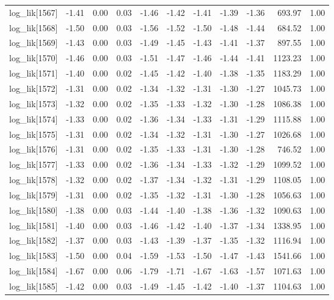 \begin{table}[ht]
\begin{tabular}{rrrrrrrrrrr}
  log\_lik[1567] & -1.41 & 0.00 & 0.03 & -1.46 & -1.42 & -1.41 & -1.39 & -1.36 & 693.97 & 1.00 \\ 
  log\_lik[1568] & -1.50 & 0.00 & 0.03 & -1.56 & -1.52 & -1.50 & -1.48 & -1.44 & 684.52 & 1.00 \\ 
  log\_lik[1569] & -1.43 & 0.00 & 0.03 & -1.49 & -1.45 & -1.43 & -1.41 & -1.37 & 897.55 & 1.00 \\ 
  log\_lik[1570] & -1.46 & 0.00 & 0.03 & -1.51 & -1.47 & -1.46 & -1.44 & -1.41 & 1123.23 & 1.00 \\ 
  log\_lik[1571] & -1.40 & 0.00 & 0.02 & -1.45 & -1.42 & -1.40 & -1.38 & -1.35 & 1183.29 & 1.00 \\ 
  log\_lik[1572] & -1.31 & 0.00 & 0.02 & -1.34 & -1.32 & -1.31 & -1.30 & -1.27 & 1045.73 & 1.00 \\ 
  log\_lik[1573] & -1.32 & 0.00 & 0.02 & -1.35 & -1.33 & -1.32 & -1.30 & -1.28 & 1086.38 & 1.00 \\ 
  log\_lik[1574] & -1.33 & 0.00 & 0.02 & -1.36 & -1.34 & -1.33 & -1.31 & -1.29 & 1115.88 & 1.00 \\ 
  log\_lik[1575] & -1.31 & 0.00 & 0.02 & -1.34 & -1.32 & -1.31 & -1.30 & -1.27 & 1026.68 & 1.00 \\ 
  log\_lik[1576] & -1.31 & 0.00 & 0.02 & -1.35 & -1.33 & -1.31 & -1.30 & -1.28 & 746.52 & 1.00 \\ 
  log\_lik[1577] & -1.33 & 0.00 & 0.02 & -1.36 & -1.34 & -1.33 & -1.32 & -1.29 & 1099.52 & 1.00 \\ 
  log\_lik[1578] & -1.32 & 0.00 & 0.02 & -1.37 & -1.34 & -1.32 & -1.31 & -1.29 & 1108.05 & 1.00 \\ 
  log\_lik[1579] & -1.31 & 0.00 & 0.02 & -1.35 & -1.32 & -1.31 & -1.30 & -1.28 & 1056.63 & 1.00 \\ 
  log\_lik[1580] & -1.38 & 0.00 & 0.03 & -1.44 & -1.40 & -1.38 & -1.36 & -1.32 & 1090.63 & 1.00 \\ 
  log\_lik[1581] & -1.40 & 0.00 & 0.03 & -1.46 & -1.42 & -1.40 & -1.37 & -1.34 & 1338.95 & 1.00 \\ 
  log\_lik[1582] & -1.37 & 0.00 & 0.03 & -1.43 & -1.39 & -1.37 & -1.35 & -1.32 & 1116.94 & 1.00 \\ 
  log\_lik[1583] & -1.50 & 0.00 & 0.04 & -1.59 & -1.53 & -1.50 & -1.47 & -1.43 & 1541.66 & 1.00 \\ 
  log\_lik[1584] & -1.67 & 0.00 & 0.06 & -1.79 & -1.71 & -1.67 & -1.63 & -1.57 & 1071.63 & 1.00 \\ 
  log\_lik[1585] & -1.42 & 0.00 & 0.03 & -1.49 & -1.45 & -1.42 & -1.40 & -1.37 & 1104.63 & 1.00 \\ 

\end{tabular}
\end{table}
